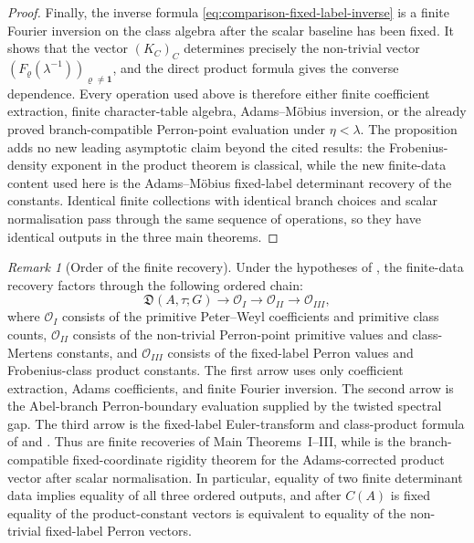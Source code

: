 \documentclass[11pt,a4paper]{amsart}
\theoremstyle{plain}
\theoremstyle{definition}
\theoremstyle{remark}
\newtheorem{remark}[theorem]{Remark}
\begin{document}
\begin{proof}
  Finally, the inverse formula \eqref{eq:comparison-fixed-label-inverse} is a
  finite Fourier inversion on the class algebra after the scalar baseline has
  been fixed.  It shows that the vector \((K_C)_C\) determines precisely the
  non-trivial vector \((F_\varrho(\lambda^{-1}))_{\varrho\ne\mathbf1}\), and
  the direct product formula gives the converse dependence.  Every operation
  used above is therefore either finite coefficient extraction, finite
  character-table algebra, Adams--M\"obius inversion, or the already proved
  branch-compatible Perron-point evaluation under \(\eta<\lambda\).  The
  proposition adds no new leading asymptotic claim beyond the cited results:
  the Frobenius-density exponent in the product theorem is classical, while the
  new finite-data content used here is the Adams--M\"obius fixed-label
  determinant recovery of the constants.  Identical
  finite collections with identical branch choices and scalar normalisation pass
  through the same sequence of operations, so they have identical outputs in
  the three main theorems.
\end{proof}

\begin{remark}[Order of the finite recovery]
  \label{rem:assembled-recovery-dependency-order}
  Under the hypotheses of , the
  finite-data recovery factors through the following ordered chain:
  \begin{equation}\label{eq:assembled-recovery-dependency-order}
    \mathfrak D(A,\tau;G)
    \longrightarrow
    \mathcal O_I
    \longrightarrow
    \mathcal O_{II}
    \longrightarrow
    \mathcal O_{III},
  \end{equation}
  where \(\mathcal O_I\) consists of the primitive Peter--Weyl coefficients
  and primitive class counts, \(\mathcal O_{II}\) consists of the
  non-trivial Perron-point primitive values and class-Mertens constants, and
  \(\mathcal O_{III}\) consists of the fixed-label Perron values and
  Frobenius-class product constants.  The first arrow uses only coefficient
  extraction, Adams coefficients, and finite Fourier inversion.  The second
  arrow is the Abel-branch Perron-boundary evaluation supplied by the
  twisted spectral gap.  The third arrow is the fixed-label Euler-transform
  and class-product formula of  and
  .  Thus
  are finite recoveries of Main Theorems~I--III, while
   is the branch-compatible
  fixed-coordinate rigidity theorem for the Adams-corrected product vector
  after scalar normalisation.
  In particular, equality of two finite determinant data implies equality
  of all three ordered outputs, and after \(C(A)\) is fixed equality of the
  product-constant vectors is equivalent to equality of the non-trivial
  fixed-label Perron vectors.
\end{remark}
\end{document}

